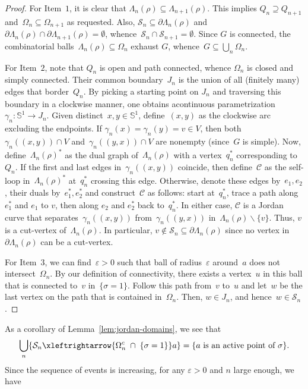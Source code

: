 \documentclass[11pt,letterpaper]{amsart}
\newcounter{n}
\numberwithin{n}{section}
\theoremstyle{plain}
\theoremstyle{definition}
\theoremstyle{remark}
\newcommand\eps\varepsilon
\renewcommand\setminus\smallsetminus
\newcommand\bbS{\mathbb S}
\newcommand\calC{\mathcal C}
\newcommand\calS{\mathcal S}
\newcommand\domain\Omega
\newcommand{\1}{\mathbbm{1}}
\renewcommand\subset\subseteq
\begin{document}
\begin{proof}
	For Item~$1$, it is clear that $\Lambda_n(\rho) \subseteq \Lambda_{n+1}(\rho)$.
	This implies $Q_n \supseteq Q_{n+1}$ and~$\domain_{n}\subseteq \domain_{n+1}$ as requested. 
	Also, $\calS_n\subseteq \partial \Lambda_n(\rho)$ and~$\partial \Lambda_n(\rho) \cap \partial \Lambda_{n+1}(\rho) = \emptyset$, whence~$\calS_n\cap \calS_{n+1} = \emptyset$.
	Since $G$ is connected, the combinatorial balls~$\Lambda_n(\rho)\subseteq \domain_n$ exhaust $G$, whence~$G \subseteq \bigcup_n \domain_n$.
	
	For Item~$2$, note that $Q_n$ is open and path connected, whence $\domain_n$ is closed and simply connected. 
	Their common boundary~$J_n$ is the union of all (finitely many) edges that border~$Q_n$.
	By picking a starting point on $J_n$ and traversing this boundary in a clockwise manner, one obtains acontinuous parametrization $\gamma_n: \bbS^1 \to J_n$.  Given distinct~$x,y\in \bbS^1$, define~$(x,y)$ as the clockwise arc excluding the endpoints. If $\gamma_n(x)=\gamma_n(y)=v\in V$, then both~$\gamma_n((x,y))\cap V$ and~$\gamma_n((y,x))\cap V$ are nonempty (since~$G$ is simple).
	Now, define~$\Lambda_n(\rho)^*$ as the dual graph of~$\Lambda_n(\rho)$ with a vertex~$q_n^*$ corresponding to~$Q_n$.
	If the first and last edges in~$\gamma_n((x,y))$ coincide, then define~$\calC$ as the self-loop in~$\Lambda_n(\rho)^*$  at~$q_n^*$ crossing this edge.  
	Otherwise, denote these edges by~$e_1,e_2$, their duals by~$e_1^*,e_2^*$ and construct~$\calC$ as follows:  start at~$q_n^*$, trace a path along $e_1^*$ and $e_1$ to $v$, then along $e_2$ and $e_2^*$ back to~$q_n^*$.
	In either case, $\calC$ is a Jordan curve that separates~$\gamma_n((x,y))$ from~$\gamma_n((y,x))$ in~$\Lambda_n(\rho) \setminus \{v\}$.
	Thus, $v$ is a cut-vertex of~$\Lambda_n(\rho)$.
	In particular, $v\not\in \calS_n\subset \partial\Lambda_n(\rho)$ since no vertex in~$\partial\Lambda_n(\rho)$ can be a cut-vertex.
	
	For Item~$3$, we can find~$\varepsilon>0$ such that ball of radius~$\varepsilon$ around~$a$ does not intersect~$\domain_n$.
	By our definition of connectivity, there exists a vertex~$u$ in this ball that is connected to~$v$ in~$\{\sigma=1\}$.
	Follow this path from~$v$ to~$u$ and let~$w$ be the last vertex on the path that is contained in~$\domain_n$.
	Then, $w\in J_n$, and hence~$w\in \calS_n$.
\end{proof}

As a corollary of Lemma~\ref{lem:jordan-domains}, we see that
\[
\bigcup_{n} \{\calS_n  \xleftrightarrow{\domain_n^c \; \cap\; \{\sigma=1\}} a\} = \{a \text{ is an active point of } \sigma \}.
\]
Since the sequence of events is increasing, for any $\eps >0$ and $n$ large enough, we have
\end{document}
